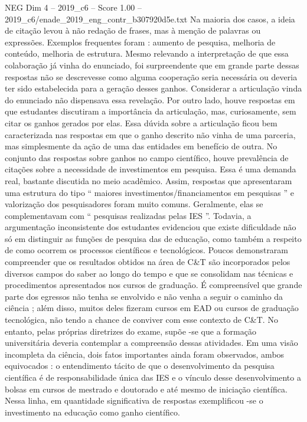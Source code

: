 \begin{textsample}{NEG Dim 4 – 2019\_c6 – Score 1.00 – 2019\_c6/enade\_2019\_eng\_contr\_b307920d5e.txt}
Na maioria dos casos, a ideia de citação levou à não redação de frases, mas à menção de palavras ou expressões.
Exemplos frequentes foram : aumento de pesquisa, melhoria de conteúdo, melhoria de estrutura.
Mesmo relevando a interpretação de que essa colaboração já vinha do enunciado, foi surpreendente que em grande parte dessas respostas não se descrevesse como alguma cooperação seria necessária ou deveria ter sido estabelecida para a geração desses ganhos.
Considerar a articulação vinda do enunciado não dispensava essa revelação.
Por outro lado, houve respostas em que estudantes discutiram a importância da articulação, mas, curiosamente, sem citar os ganhos gerados por elas.
Essa dúvida sobre a articulação ficou bem caracterizada nas respostas em que o ganho descrito não vinha de uma parceria, mas simplesmente da ação de uma das entidades em benefício de outra.
No conjunto das respostas sobre ganhos no campo científico, houve prevalência de citações sobre a necessidade de investimentos em pesquisa.
Essa é uma demanda real, bastante discutida no meio acadêmico.
Assim, respostas que apresentaram uma estrutura do tipo “ maiores investimentos/financiamentos em pesquisas ” e valorização dos pesquisadores foram muito comuns.
Geralmente, elas se complementavam com “ pesquisas realizadas pelas IES ”.
Todavia, a argumentação inconsistente dos estudantes evidenciou que existe dificuldade não só em distinguir as funções de pesquisa das de educação, como também a respeito de como ocorrem os processos científicos e tecnológicos.
Poucos demonstraram compreender que os resultados obtidos na área de C\&T são incorporados pelos diversos campos do saber ao longo do tempo e que se consolidam nas técnicas e procedimentos apresentados nos cursos de graduação.
É compreensível que grande parte dos egressos não tenha se envolvido e não venha a seguir o caminho da ciência ; além disso, muitos deles fizeram cursos em EAD ou cursos de graduação tecnológica, não tendo a chance de conviver com esse contexto de C\&T.
No entanto, pelas próprias diretrizes do exame, supõe -se que a formação universitária deveria contemplar a compreensão dessas atividades.
Em uma visão incompleta da ciência, dois fatos importantes ainda foram observados, ambos equivocados : o entendimento tácito de que o desenvolvimento da pesquisa científica é de responsabilidade única das IES e o vínculo desse desenvolvimento a bolsas em cursos de mestrado e doutorado e até mesmo de iniciação científica.
Nessa linha, em quantidade significativa de respostas exemplificou -se o investimento na educação como ganho científico.

\end{textsample}
